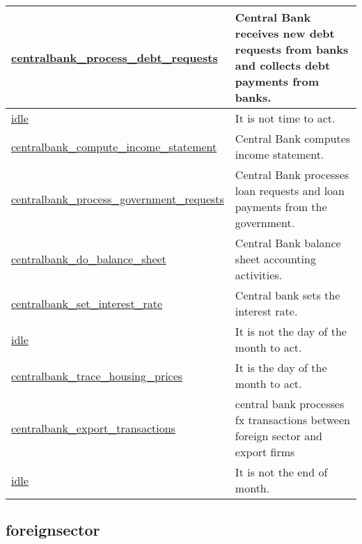 \documentclass[a4paper,11pt]{article}
\begin{document}
\begin{longtable}[H!]{ll}
\midrule
\parbox{5cm}{\url{centralbank_process_debt_requests}}  & \parbox{10cm}{Central Bank receives new debt requests from banks and collects debt payments from banks.} \\
\midrule
\parbox{5cm}{\url{idle}}  & \parbox{10cm}{It is not time to act.} \\
\midrule
\parbox{5cm}{\url{centralbank_compute_income_statement}}  & \parbox{10cm}{Central Bank computes income statement.} \\
\midrule
\parbox{5cm}{\url{centralbank_process_government_requests}}  & \parbox{10cm}{Central Bank processes loan requests and loan payments from the government.} \\
\midrule
\parbox{5cm}{\url{centralbank_do_balance_sheet}}  & \parbox{10cm}{Central Bank balance sheet accounting activities.} \\
\midrule
\parbox{5cm}{\url{centralbank_set_interest_rate}}  & \parbox{10cm}{Central bank sets the interest rate.} \\
\midrule
\parbox{5cm}{\url{idle}}  & \parbox{10cm}{It is not the day of the month to act.} \\
\midrule
\parbox{5cm}{\url{centralbank_trace_housing_prices}}  & \parbox{10cm}{It is the day of the month to act.} \\
\midrule
\parbox{5cm}{\url{centralbank_export_transactions}}  & \parbox{10cm}{central bank processes fx transactions between foreign sector and export firms} \\
\midrule
\parbox{5cm}{\url{idle}}  & \parbox{10cm}{It is not the end of month.} \\
\end{longtable}

\subsection{foreignsector}
\end{document}
